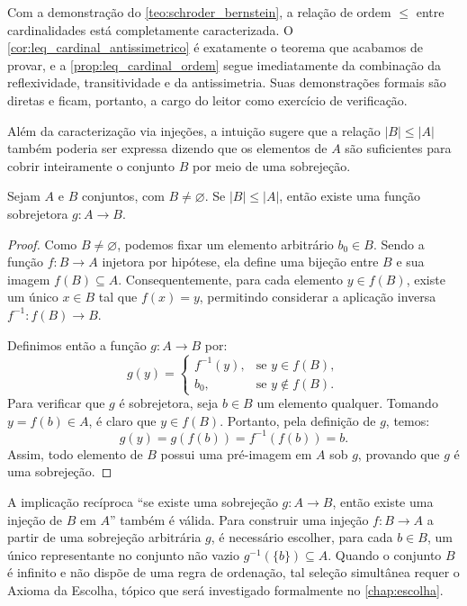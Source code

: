Com a demonstração do \autoref{teo:schroder_bernstein}, a relação de ordem \(\leq\) entre cardinalidades está completamente caracterizada. O \autoref{cor:leq_cardinal_antissimetrico} é exatamente o teorema que acabamos de provar, e a \autoref{prop:leq_cardinal_ordem} segue imediatamente da combinação da reflexividade, transitividade e da antissimetria. Suas demonstrações formais são diretas e ficam, portanto, a cargo do leitor como exercício de verificação.

Além da caracterização via injeções, a intuição sugere que a relação \(|B| \leq |A|\) também poderia ser expressa dizendo que os elementos de \(A\) são suficientes para cobrir inteiramente o conjunto \(B\) por meio de uma sobrejeção.

\begin{proposicao}
    \label{prop:injecao_implica_sobrejecao}
    Sejam \(A\) e \(B\) conjuntos, com \(B \neq \varnothing\). Se \(|B| \leq |A|\), então existe uma função sobrejetora \(g: A \to B\).
\end{proposicao}

\begin{proof}
    Como \(B \neq \varnothing\), podemos fixar um elemento arbitrário \(b_0 \in B\).
    Sendo a função \(f: B \to A\) injetora por hipótese, ela define uma bijeção entre \(B\) e sua imagem \(f(B) \subseteq A\). Consequentemente, para cada elemento \(y \in f(B)\), existe um único \(x \in B\) tal que \(f(x) = y\), permitindo considerar a aplicação inversa \(f^{-1}: f(B) \to B\).

    Definimos então a função \(g: A \to B\) por:
    \[
        g(y) =
        \begin{cases}
            f^{-1}(y), & \text{se } y \in f(B),    \\
            b_0,       & \text{se } y \notin f(B).
        \end{cases}
    \]
    Para verificar que \(g\) é sobrejetora, seja \(b \in B\) um elemento qualquer. Tomando \(y = f(b) \in A\), é claro que \(y \in f(B)\). Portanto, pela definição de \(g\), temos:
    \[
        g(y) = g(f(b)) = f^{-1}(f(b)) = b.
    \]
    Assim, todo elemento de \(B\) possui uma pré-imagem em \(A\) sob \(g\), provando que \(g\) é uma sobrejeção.
\end{proof}

A implicação recíproca ``se existe uma sobrejeção \(g: A \to B\), então existe uma injeção de \(B\) em \(A\)'' também é válida. Para construir uma injeção \(f: B \to A\) a partir de uma sobrejeção arbitrária \(g\), é necessário escolher, para cada \(b \in B\), um único representante no conjunto não vazio \(g^{-1}(\{b\}) \subseteq A\). Quando o conjunto \(B\) é infinito e não dispõe de uma regra de ordenação, tal seleção simultânea requer o Axioma da Escolha, tópico que será investigado formalmente no \autoref{chap:escolha}.

